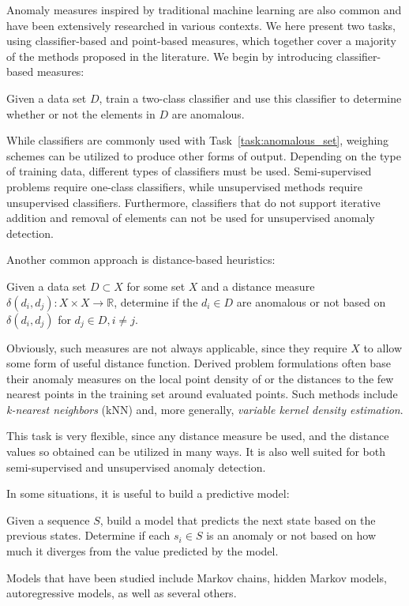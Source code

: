 Anomaly measures inspired by traditional machine learning are also common and have been extensively researched in various contexts. We here present two tasks, using classifier-based and point-based measures, which together cover a majority of the methods proposed in the literature. We begin by introducing classifier-based measures:

\begin{task}
  Given a data set $D$, train a two-class classifier and use this classifier to determine whether or not the elements in $D$ are anomalous.
\end{task}

While classifiers are commonly used with Task~\ref{task:anomalous_set}, weighing schemes can be utilized to produce other forms of output. Depending on the type of training data, different types of classifiers must be used. Semi-supervised problems require one-class classifiers, while unsupervised methods require unsupervised classifiers. Furthermore, classifiers that do not support iterative addition and removal of elements can not be used for unsupervised anomaly detection.

Another common approach is distance-based heuristics:
\begin{task}
  Given a data set $D \subset X$ for some set $X$ and a distance measure $\delta(d_i, d_j): X \times X \rightarrow \mathbb{R}$, determine if the $d_i \in D$ are anomalous or not based on $\delta(d_i, d_j)$ for $d_j \in D, i \neq j$.
\end{task}
Obviously, such measures are not always applicable, since they require $X$ to allow some form of useful distance function. Derived problem formulations often base their anomaly measures on the local point density of or the distances to the few nearest points in the training set around evaluated points. Such methods include \emph{k-nearest neighbors} (kNN) and, more generally, \emph{variable kernel density estimation}.

This task is very flexible, since any distance measure be used, and the distance values so obtained can be utilized in many ways. It is also well suited for both semi-supervised and unsupervised anomaly detection.

In some situations, it is useful to build a predictive model:
\begin{task}
\label{task:predictive_model}
  Given a sequence $S$, build a model that predicts the next state based on the previous states. Determine if each $s_i \in S$ is an anomaly or not based on how much it diverges from the value predicted by the model.
\end{task}
Models that have been studied include Markov chains, hidden Markov models, autoregressive models, as well as several others.


